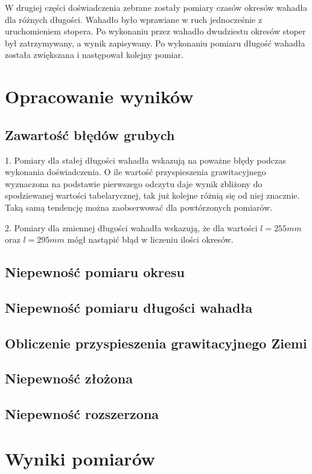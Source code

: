 \documentclass[a4paper,10pt,twoside]{article}
\begin{document}
W drugiej części doświadczenia zebrane zostały pomiary czasów okresów wahadła dla różnych długości. Wahadło było wprawiane w ruch jednocześnie z uruchomieniem stopera. Po wykonaniu przez wahadło dwudziestu okresów stoper był zatrzymywany, a wynik zapisywany. Po wykonaniu pomiaru długość wahadła została zwiększana i następował kolejny pomiar.

\section{Opracowanie wyników}

\subsection{Zawartość błędów grubych}

1. Pomiary dla stałej długości wahadła wskazują na poważne błędy podczas wykonania doświadczenia. O ile wartość przyspieszenia grawitacyjnego wyznaczona na podstawie pierwszego odczytu daje wynik zbliżony do spodziewanej wartości tabelarycznej, tak już kolejne różnią się od niej znacznie. Taką samą tendencję można zaobserwować dla powtórzonych pomiarów.

2. Pomiary dla zmiennej długości wahadła wskazują, że dla wartości $l=255mm$ oraz $l=295mm$ mógł nastąpić błąd w liczeniu ilości okresów.

\subsection{Niepewność pomiaru okresu}
\subsection{Niepewność pomiaru długości wahadła}
\subsection{Obliczenie przyspieszenia grawitacyjnego Ziemi}
\subsection{Niepewność złożona}
\subsection{Niepewność rozszerzona}

\section{Wyniki pomiarów}
\end{document}
